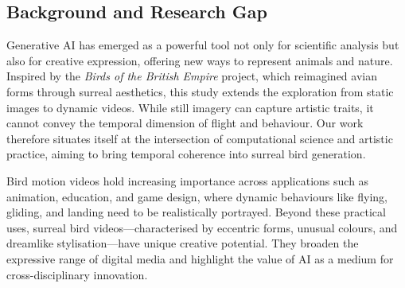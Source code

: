 \documentclass[final-report]{report-template}
\begin{document}


\subsection{Background and Research Gap}
Generative AI has emerged as a powerful tool not only for scientific analysis but also for creative expression, offering new ways to represent animals and nature. Inspired by the \emph{Birds of the British Empire} project, which reimagined avian forms through surreal aesthetics, this study extends the exploration from static images to dynamic videos. While still imagery can capture artistic traits, it cannot convey the temporal dimension of flight and behaviour. Our work therefore situates itself at the intersection of computational science and artistic practice, aiming to bring temporal coherence into surreal bird generation.  

Bird motion videos hold increasing importance across applications such as animation, education, and game design, where dynamic behaviours like flying, gliding, and landing need to be realistically portrayed. Beyond these practical uses, surreal bird videos—characterised by eccentric forms, unusual colours, and dreamlike stylisation—have unique creative potential. They broaden the expressive range of digital media and highlight the value of AI as a medium for cross-disciplinary innovation.  

\end{document}
